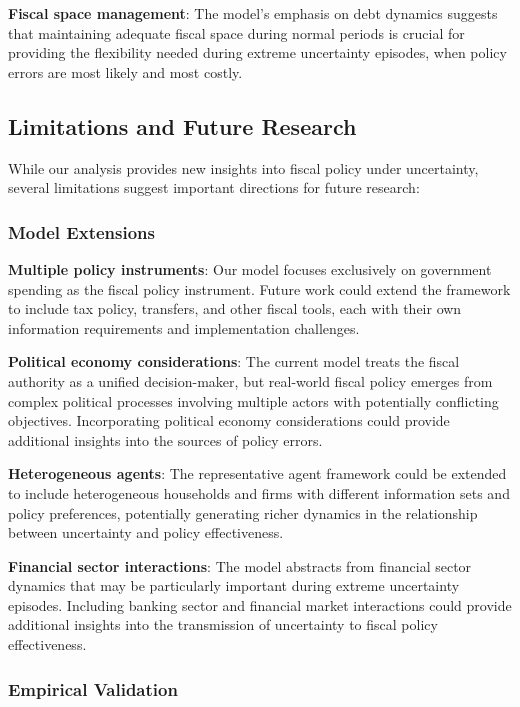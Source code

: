 \documentclass[5p,authoryear]{elsarticle}
\begin{document}
\textbf{Fiscal space management}: The model's emphasis on debt dynamics suggests that maintaining adequate fiscal space during normal periods is crucial for providing the flexibility needed during extreme uncertainty episodes, when policy errors are most likely and most costly.

\subsection{Limitations and Future Research}

While our analysis provides new insights into fiscal policy under uncertainty, several limitations suggest important directions for future research:

\subsubsection{Model Extensions}

\textbf{Multiple policy instruments}: Our model focuses exclusively on government spending as the fiscal policy instrument. Future work could extend the framework to include tax policy, transfers, and other fiscal tools, each with their own information requirements and implementation challenges.

\textbf{Political economy considerations}: The current model treats the fiscal authority as a unified decision-maker, but real-world fiscal policy emerges from complex political processes involving multiple actors with potentially conflicting objectives. Incorporating political economy considerations could provide additional insights into the sources of policy errors.

\textbf{Heterogeneous agents}: The representative agent framework could be extended to include heterogeneous households and firms with different information sets and policy preferences, potentially generating richer dynamics in the relationship between uncertainty and policy effectiveness.

\textbf{Financial sector interactions}: The model abstracts from financial sector dynamics that may be particularly important during extreme uncertainty episodes. Including banking sector and financial market interactions could provide additional insights into the transmission of uncertainty to fiscal policy effectiveness.

\subsubsection{Empirical Validation}
\end{document}

